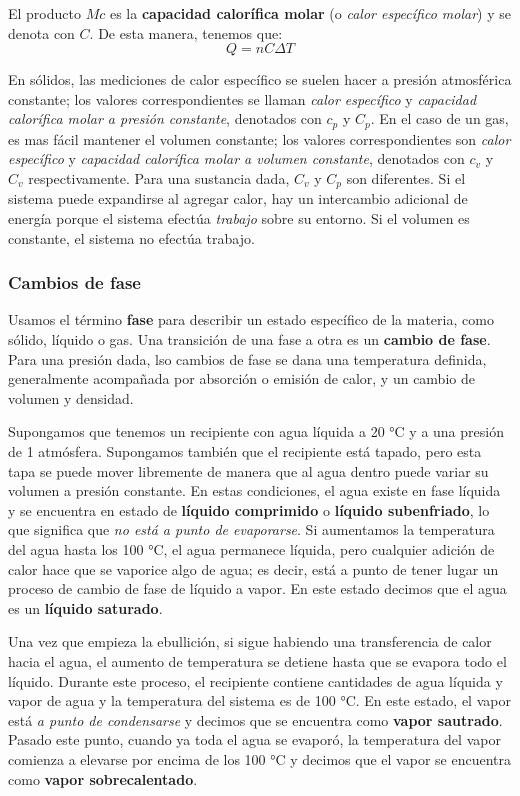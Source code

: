 \documentclass[12pt]{article}
\begin{document}
  El producto $ Mc $ es la \textbf{capacidad calorífica molar} (o \textit{calor específico molar}) y se denota con $ C $. De esta manera, tenemos que:
  \[
  Q = nC\Delta T
  \]

  En sólidos, las mediciones de calor específico se suelen hacer a presión atmosférica constante; los valores correspondientes se llaman \textit{calor específico} y \textit{capacidad calorífica molar a presión constante}, denotados con $ c_{p} $ y $ C_{p} $. En el caso de un gas, es mas fácil mantener el volumen constante; los valores correspondientes son \textit{calor específico} y \textit{capacidad calorífica molar a volumen constante}, denotados con $ c_{v} $ y $ C_{v} $ respectivamente. Para una sustancia dada, $ C_{v} $ y $ C_{p} $ son diferentes. Si el sistema puede expandirse al agregar calor, hay un intercambio adicional de energía porque el sistema efectúa \textit{trabajo} sobre su entorno. Si el volumen es constante, el sistema no efectúa trabajo. 

  \subsubsection{Cambios de fase}
  Usamos el término \textbf{fase} para describir un estado específico de la materia, como sólido, líquido o gas. Una transición de una fase a otra es un \textbf{cambio de fase}. Para una presión dada, lso cambios de fase se dana una temperatura definida, generalmente acompañada por absorción o emisión de calor, y un cambio de volumen y densidad.

  Supongamos que tenemos un recipiente con agua líquida a 20 °C y a una presión de 1 atmósfera. Supongamos también que el recipiente está tapado, pero esta tapa se puede mover libremente de manera que al agua dentro puede variar su volumen a presión constante. En estas condiciones, el agua existe en fase líquida y se encuentra en estado de \textbf{líquido comprimido} o \textbf{líquido subenfriado}, lo que significa que \textit{no está a punto de evaporarse}. Si aumentamos la temperatura del agua hasta los 100 °C, el agua permanece líquida, pero cualquier adición de calor hace que se vaporice algo de agua; es decir, está a punto de tener lugar un proceso de cambio de fase de líquido a vapor. En este estado decimos que el agua es un \textbf{líquido saturado}. 

  Una vez que empieza la ebullición, si sigue habiendo una transferencia de calor hacia el agua, el aumento de temperatura se detiene hasta que se evapora todo el líquido. Durante este proceso, el recipiente contiene cantidades de agua líquida y vapor de agua y la temperatura del sistema es de 100 °C. En este estado, el vapor está \textit{a punto de condensarse} y decimos que  se encuentra como \textbf{vapor sautrado}. Pasado este punto, cuando ya toda el agua se evaporó, la temperatura del vapor comienza a elevarse por encima de los 100 °C y decimos que el vapor se encuentra como \textbf{vapor sobrecalentado}.
\end{document}
